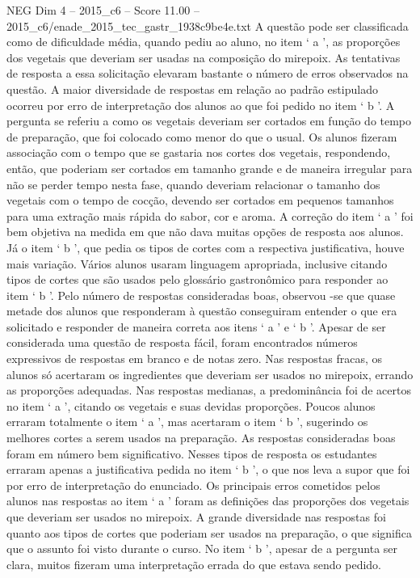 \begin{textsample}{NEG Dim 4 – 2015\_c6 – Score 11.00 – 2015\_c6/enade\_2015\_tec\_gastr\_1938c9be4e.txt}
A questão pode ser classificada como de dificuldade média, quando pediu ao aluno, no item ‘ a ’, as proporções dos vegetais que deveriam ser usadas na composição do mirepoix.
As tentativas de resposta a essa solicitação elevaram bastante o número de erros observados na questão.
A maior diversidade de respostas em relação ao padrão estipulado ocorreu por erro de interpretação dos alunos ao que foi pedido no item ‘ b ’.
A pergunta se referiu a como os vegetais deveriam ser cortados em função do tempo de preparação, que foi colocado como menor do que o usual.
Os alunos fizeram associação com o tempo que se gastaria nos cortes dos vegetais, respondendo, então, que poderiam ser cortados em tamanho grande e de maneira irregular para não se perder tempo nesta fase, quando deveriam relacionar o tamanho dos vegetais com o tempo de cocção, devendo ser cortados em pequenos tamanhos para uma extração mais rápida do sabor, cor e aroma.
A correção do item ‘ a ’ foi bem objetiva na medida em que não dava muitas opções de resposta aos alunos.
Já o item ‘ b ’, que pedia os tipos de cortes com a respectiva justificativa, houve mais variação.
Vários alunos usaram linguagem apropriada, inclusive citando tipos de cortes que são usados pelo glossário gastronômico para responder ao item ‘ b ’.
Pelo número de respostas consideradas boas, observou -se que quase metade dos alunos que responderam à questão conseguiram entender o que era solicitado e responder de maneira correta aos itens ‘ a ’ e ‘ b ’.
Apesar de ser considerada uma questão de resposta fácil, foram encontrados números expressivos de respostas em branco e de notas zero.
Nas respostas fracas, os alunos só acertaram os ingredientes que deveriam ser usados no mirepoix, errando as proporções adequadas.
Nas respostas medianas, a predominância foi de acertos no item ‘ a ’, citando os vegetais e suas devidas proporções.
Poucos alunos erraram totalmente o item ‘ a ’, mas acertaram o item ‘ b ’, sugerindo os melhores cortes a serem usados na preparação.
As respostas consideradas boas foram em número bem significativo.
Nesses tipos de resposta os estudantes erraram apenas a justificativa pedida no item ‘ b ’, o que nos leva a supor que foi por erro de interpretação do enunciado.
Os principais erros cometidos pelos alunos nas respostas ao item ‘ a ’ foram as definições das proporções dos vegetais que deveriam ser usados no mirepoix.
A grande diversidade nas respostas foi quanto aos tipos de cortes que poderiam ser usados na preparação, o que significa que o assunto foi visto durante o curso.
No item ‘ b ’, apesar de a pergunta ser clara, muitos fizeram uma interpretação errada do que estava sendo pedido.

\end{textsample}
